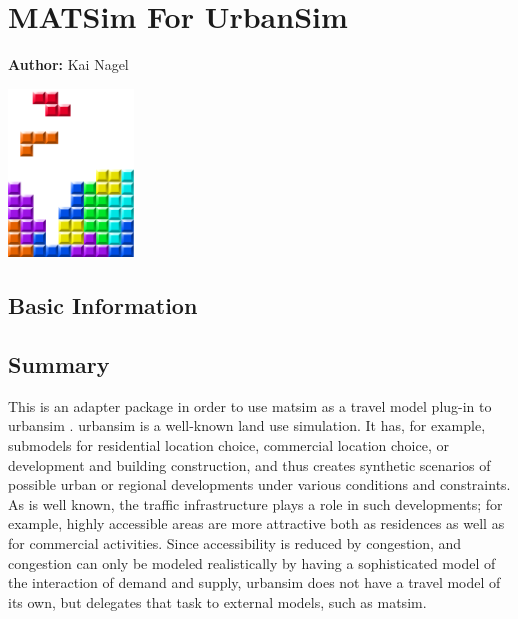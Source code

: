 \chapter{MATSim For UrbanSim}
\label{ch:matsim4urbansim}

\hfill \textbf{Author:} Kai Nagel

\begin{center} \includegraphics[width=0.25\textwidth, angle=0]{frontmatter/figures/MATSimBook.png} \end{center}

\section{Basic Information}
\label{sec:matsim4urbansim-stdInfo}


\section{Summary}


This is an adapter package in order to use \gls{matsim} as a travel model plug-in to \acrshort{urbansim} \citep[e.g.][see \url{http://www.urbansim.org}]{WaddellEtc2003UrbanSim}.
%
\acrshort{urbansim} is a well-known land use simulation.  It has, for example, submodels for residential location choice, commercial location choice, or development and building construction, and thus creates synthetic scenarios of possible urban or regional developments under various conditions and constraints.  As is well known, the traffic infrastructure plays a role in such developments; for example, highly accessible areas are more attractive both as residences as well as for commercial activities.  Since accessibility is reduced by congestion, and congestion can only be modeled realistically by having a sophisticated model of the interaction of demand and supply, \acrshort{urbansim} does not have a travel model of its own, but delegates that task to external models, such as \gls{matsim}.


